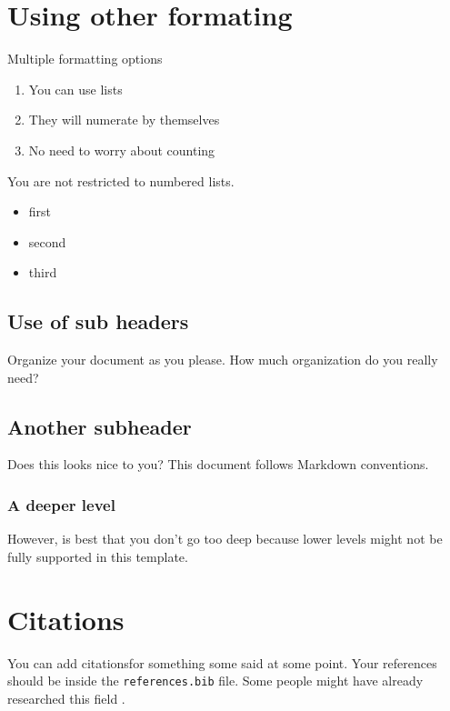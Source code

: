 \documentclass[
  number,
  preprint,
  3p,
  twocolumn]{elsarticle}
\providecommand{\tightlist}{%
  \setlength{\itemsep}{0pt}\setlength{\parskip}{0pt}}\usepackage{longtable,booktabs,array}
\begin{document}
\section{Using other formating}\label{using-other-formating}

Multiple formatting options

\begin{enumerate}
\def\labelenumi{\arabic{enumi}.}
\tightlist
\item
  You can use lists
\item
  They will numerate by themselves
\item
  No need to worry about counting
\end{enumerate}

You are not restricted to numbered lists.

\begin{itemize}
\tightlist
\item
  first
\item
  second
\item
  third
\end{itemize}

\subsection{Use of sub headers}\label{use-of-sub-headers}

Organize your document as you please. How much organization do you
really need?

\subsection{Another subheader}\label{another-subheader}

Does this looks nice to you? This document follows Markdown conventions.

\subsubsection{A deeper level}\label{a-deeper-level}

However, is best that you don't go too deep because lower levels might
not be fully supported in this template.

\section{Citations}\label{citations}

You can add citationsfor something some said at some point. Your
references should be inside the \texttt{references.bib} file. Some
people might have already researched this field
\citep[see][pp.~1-2]{misc_online_news_popularity_332}.


\renewcommand\refname{References}
  
\end{document}
